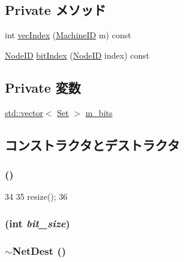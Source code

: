 \subsection*{Private メソッド}
\begin{DoxyCompactItemize}
\item 
int \hyperlink{classNetDest_a83881a62959b057cd15b888a8c61c7e6}{vecIndex} (\hyperlink{structMachineID}{MachineID} m) const 
\item 
\hyperlink{TypeDefines_8hh_a83c14b4ae37e80071f6b3506a6c46151}{NodeID} \hyperlink{classNetDest_a2e3a5424526ce278ba80f77e8066de05}{bitIndex} (\hyperlink{TypeDefines_8hh_a83c14b4ae37e80071f6b3506a6c46151}{NodeID} index) const 
\end{DoxyCompactItemize}
\subsection*{Private 変数}
\begin{DoxyCompactItemize}
\item 
\hyperlink{classstd_1_1vector}{std::vector}$<$ \hyperlink{classSet}{Set} $>$ \hyperlink{classNetDest_ac0959126d3ef138cfbd0499eaca44f23}{m\_\-bits}
\end{DoxyCompactItemize}


\subsection{コンストラクタとデストラクタ}
\hypertarget{classNetDest_a4ecec6e900f50203df05a785b5b88e1c}{
\subsubsection[{NetDest}]{ ()}}
\label{classNetDest_a4ecec6e900f50203df05a785b5b88e1c}



\begin{DoxyCode}
34 {
35   resize();
36 }
\end{DoxyCode}
\hypertarget{classNetDest_aeaef8a119d3eb01b0a0c0492079eb21b}{
\subsubsection[{NetDest}]{ (int {\em bit\_\-size})}}
\label{classNetDest_aeaef8a119d3eb01b0a0c0492079eb21b}
\hypertarget{classNetDest_a0152f2294384fa9f28bbbd134abc6201}{
\subsubsection[{$\sim$NetDest}]{\setlength{\rightskip}{0pt plus 5cm}$\sim${\bf NetDest} ()}}
\label{classNetDest_a0152f2294384fa9f28bbbd134abc6201}



